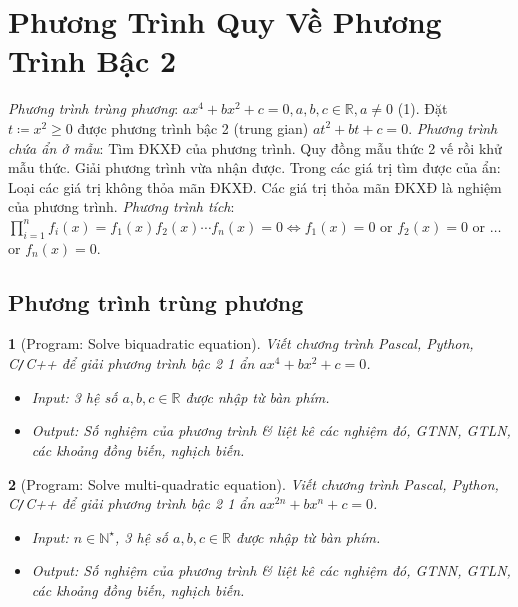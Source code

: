 \documentclass{article}
\newtheorem{baitoan}{}
\begin{document}

\section{Phương Trình Quy Về Phương Trình Bậc 2}
 \textit{Phương trình trùng phương}: $ax^4 + bx^2 + c = 0,a,b,c\in\mathbb{R},a\ne0$ (1). Đặt $t\coloneqq x^2\ge0$ được phương trình bậc 2 (trung gian) $at^2 + bt + c = 0$.  \textit{Phương trình chứa ẩn ở mẫu}: Tìm ĐKXĐ của phương trình. Quy đồng mẫu thức 2 vế rồi khử mẫu thức. Giải phương trình vừa nhận được. Trong các giá trị tìm được của ẩn: Loại các giá trị không thỏa mãn ĐKXĐ. Các giá trị thỏa mãn ĐKXĐ là nghiệm của phương trình.  \textit{Phương trình tích}: $\prod_{i=1}^n f_i(x) = f_1(x)f_2(x)\cdots f_n(x) = 0\Leftrightarrow f_1(x) = 0$ or $f_2(x) = 0$ or $\ldots$ or $f_n(x) = 0$.

\subsection{Phương trình trùng phương}

\begin{baitoan}[{\sf Program}: Solve biquadratic equation]
	Viết chương trình {\sf Pascal, Python, C{\tt/}C++} để giải phương trình bậc 2 1 ẩn $ax^4 + bx^2 + c = 0$.
	\begin{itemize}
		\item {\sf Input}: 3 hệ số $a,b,c\in\mathbb{R}$ được nhập từ bàn phím.
		\item {\sf Output}: Số nghiệm của phương trình \& liệt kê các nghiệm đó, {\rm GTNN, GTLN}, các khoảng đồng biến, nghịch biến.
	\end{itemize}
\end{baitoan}

\begin{baitoan}[{\sf Program}: Solve multi-quadratic equation]
	Viết chương trình {\sf Pascal, Python, C{\tt/}C++} để giải phương trình bậc 2 1 ẩn $ax^{2n} + bx^n + c = 0$.
	\begin{itemize}
		\item {\sf Input}: $n\in\mathbb{N}^\star$, 3 hệ số $a,b,c\in\mathbb{R}$ được nhập từ bàn phím.
		\item {\sf Output}: Số nghiệm của phương trình \& liệt kê các nghiệm đó, {\rm GTNN, GTLN}, các khoảng đồng biến, nghịch biến.
	\end{itemize}
\end{baitoan}
\end{document}
